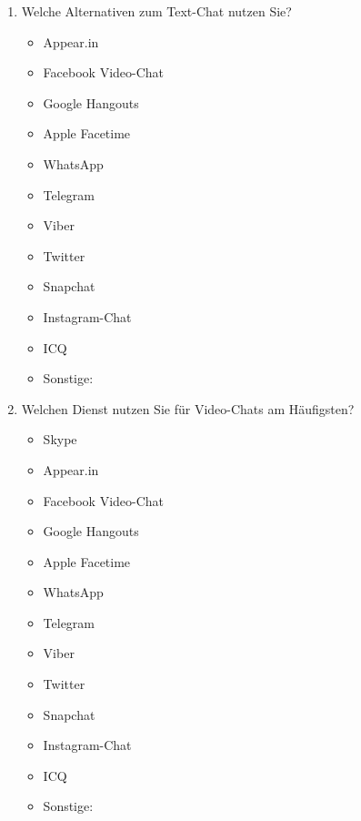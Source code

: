 \begin{enumerate}[resume]
\item Welche Alternativen zum Text-Chat nutzen Sie?

		\begin{itemize}
		\item[\Circle] Appear.in
        \item[\Circle] Facebook Video-Chat
        \item[\Circle] Google Hangouts
        \item[\Circle] Apple Facetime
        \item[\Circle] WhatsApp
        \item[\Circle] Telegram
        \item[\Circle] Viber
        \item[\Circle] Twitter
        \item[\Circle] Snapchat
        \item[\Circle] Instagram-Chat
        \item[\Circle] ICQ
        \item[\Circle] Sonstige:~\underline{\hspace{7.5cm}}
        \end{itemize}



\item Welchen Dienst nutzen Sie für Video-Chats am Häufigsten?

		\begin{itemize}
        \item[\Circle] Skype
		\item[\Circle] Appear.in
        \item[\Circle] Facebook Video-Chat
        \item[\Circle] Google Hangouts
        \item[\Circle] Apple Facetime
        \item[\Circle] WhatsApp
        \item[\Circle] Telegram
        \item[\Circle] Viber
        \item[\Circle] Twitter
        \item[\Circle] Snapchat
        \item[\Circle] Instagram-Chat
        \item[\Circle] ICQ
        \item[\Circle] Sonstige:~\underline{\hspace{7.5cm}}
        \end{itemize}



\end{enumerate}

